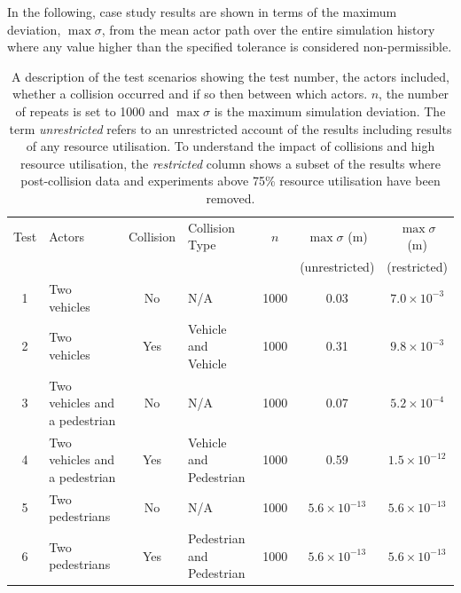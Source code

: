 \documentclass[letterpaper, 10 pt, journal, twoside]{IEEEtran}
\begin{document}
In the following, case study results are shown in terms of the maximum deviation, $\max\sigma$, from the mean actor path over the entire simulation history where any value higher than the specified tolerance is considered non-permissible.
%


\begin{table}[b]
\centering
\begin{tabular}{clclccc}
\toprule
Test & Actors 					 	  & Collision 	 & Collision Type 			 & $n$  & $\max\sigma$ (m) & $\max\sigma$ (m) \\ 
	 & 								  & 			 & 							 &	    & (unrestricted)  & (restricted)	\\ \midrule
1    & Two vehicles                   & No  		 & N/A 			  			 & 1000 & 0.03 & $7.0{\times}10^{-3}$ \\
2    & Two vehicles                   & Yes 		 & Vehicle and Vehicle 		 & 1000 & 0.31 & $9.8{\times}10^{-3}$ \\
3    & Two vehicles and a pedestrian  & No  		 & N/A 			  			 & 1000 & 0.07 & $5.2{\times}10^{-4}$ \\
4    & Two vehicles and a pedestrian  & Yes 		 & Vehicle and Pedestrian 	 & 1000 & 0.59 & $1.5{\times}10^{-12}$ \\
5    & Two pedestrians                & No  		 & N/A 			  			 & 1000 & $5.6{\times}10^{-13}$ & $5.6{\times}10^{-13}$ \\
6    & Two pedestrians                & Yes 		 & Pedestrian and Pedestrian & 1000 & $5.6{\times}10^{-13}$ & $5.6{\times}10^{-13}$ \\
\bottomrule
\end{tabular}
\caption{A description of the test scenarios showing the test number, the actors included, whether a collision occurred and if so then between which actors. $n$, the number of repeats is set to 1000 and $\max\sigma$ is the maximum simulation deviation. The term \textit{unrestricted} refers to an unrestricted account of the results including results of any resource utilisation. To understand the impact of collisions and high resource utilisation, the \textit{restricted} column shows a subset of the results where post-collision data and experiments above 75\% resource utilisation have been removed.}
\label{TableOfExperiments}
\end{table}
\end{document}
